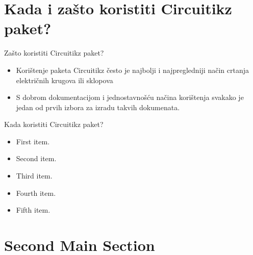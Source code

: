 \documentclass{beamer}
\begin{document}
\section{Kada i zašto koristiti Circuitikz paket?}

\begin{frame}{Zašto koristiti Circuitikz paket?}
  \begin{itemize}
  \item {
    Korištenje paketa Circuitikz često je najbolji i
    najpregledniji način crtanja električnih krugova
    ili sklopova
  }
  \item{
    S dobrom dokumentacijom i jednostavnošću načina korištenja
    svakako je jedan od prvih izbora za izradu takvih 
    dokumenata.
  }
  \end{itemize}
\end{frame}

\begin{frame}{Kada koristiti Circuitikz paket?}
\end{frame}

\begin{frame}
  \begin{itemize}
  \item {
    First item.
  }
  \item {   
    Second item.
  }

  \item<3-> {
    Third item.
  }
  \item<4-> {
    Fourth item.
  }
  
  \item<5-> {
    Fifth item. 
  }
  \end{itemize}
\end{frame}

\section{Second Main Section}
\end{document}
